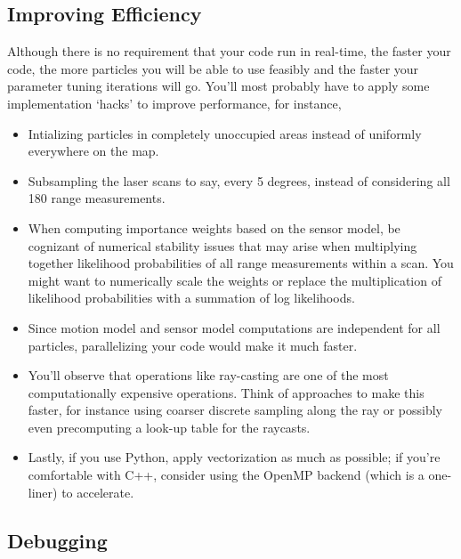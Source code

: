 \documentclass[12pt, a4paper]{article}
\begin{document}
\subsection*{Improving Efficiency}

Although there is no requirement that your code run in real-time, the faster your code,
the more particles you will be able to use feasibly and the faster your parameter tuning
iterations will go. You'll most probably have to
apply some implementation `hacks' to improve performance, for instance,
\begin{itemize}
	\item Intializing particles in completely unoccupied areas instead of uniformly
	      everywhere on the map.
	\item Subsampling the laser scans to say, every 5 degrees, instead of considering
	      all 180 range measurements.
	\item When computing importance weights based on the sensor model, be cognizant
	      of numerical stability issues that may arise when multiplying together
	      likelihood probabilities of all range measurements within a scan.
	      You might want to numerically scale the weights or replace the multiplication
	      of likelihood probabilities with a summation of log likelihoods.
	\item Since motion model and sensor model computations are independent for
	      all particles, parallelizing your code would make it much faster.
	\item You'll observe that operations like ray-casting are one of the most
	      computationally expensive operations. Think of approaches to make
	      this faster, for instance using coarser discrete sampling along the
	      ray or possibly even precomputing a look-up table for the raycasts.
	\item Lastly, if you use Python, apply vectorization as much as possible; if you're comfortable with C++, consider using the OpenMP backend (which is a one-liner) to accelerate.
\end{itemize}

\subsection*{Debugging}
\end{document}
